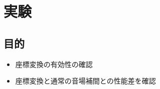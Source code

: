 \documentclass[sip,biber]{now-journal}
\begin{document}

\section{実験}
\subsection*{目的}
\begin{itemize}
  \item 座標変換の有効性の確認
  \item 座標変換と通常の音場補間との性能差を確認
\end{itemize}
\end{document}
